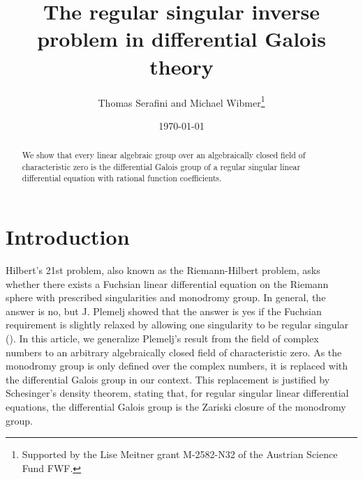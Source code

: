 \documentclass[a4paper, 11pt]{article}
\title{The regular singular inverse problem in differential Galois theory}
\author{Thomas Serafini and Michael Wibmer\thanks{Supported by the Lise Meitner grant M-2582-N32 of the Austrian Science Fund FWF.}}
\date{\today}
\begin{document}
\maketitle

\begin{abstract}
	We show that every linear algebraic group over an algebraically closed field of characteristic zero is the differential Galois group of a regular singular linear differential equation with rational function coefficients. %
	\let\thefootnote\relax{}
\end{abstract}


	
\section{Introduction}
Hilbert's 21st problem, also known as the Riemann-Hilbert problem, asks whether there exists a Fuchsian linear differential equation on the Riemann sphere with prescribed singularities and monodromy group. In general, the answer is no, but J. Plemelj showed that the answer is yes if the Fuchsian requirement is slightly relaxed by allowing one singularity to be regular singular (\cite{AnasovBolibruch:TheRiemannHilbertProblem}). In this article, we generalize Plemelj's result from the field of complex numbers to an arbitrary algebraically closed field of characteristic zero. As the monodromy group is only defined over the complex numbers, it is replaced with the differential Galois group in our context. This replacement is justified by Schesinger's density theorem, stating that, for regular singular linear differential equations, the differential Galois group is the Zariski closure of the monodromy group.
\end{document}
